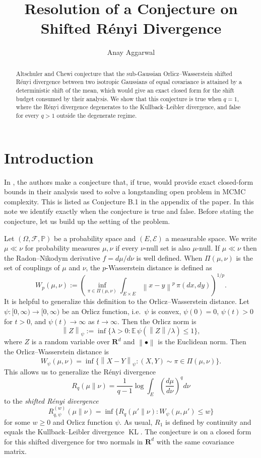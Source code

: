 \documentclass[11pt,reqno]{amsart}
\author{Anay Aggarwal}
\theoremstyle{definition}
\theoremstyle{remark}
\def\R{\mathbf{R}}
\newcommand\opr[1]{\operatorname{#1}}
\newcommand{\pp}{\mathbb{P}}
\newcommand{\ee}{\mathbb{E}}
\def\KL{\opr{KL}}
\newcommand{\norm}[1]{\left\lVert#1\right\rVert}
\numberwithin{equation}{section}
\begin{document}
\title[Shifted R\'enyi Divergence]{Resolution of a Conjecture on Shifted R\'enyi Divergence}

\begin{abstract}
Altschuler and Chewi \cite{altschuler2023fasterhighaccuracylogconcavesampling} conjecture that the sub-Gaussian Orlicz--Wasserstein shifted R\'enyi divergence between two isotropic Gaussians of equal covariance is attained by a deterministic shift of the mean, which would give an exact closed form for the shift budget consumed by their analysis. We show that this conjecture is true when $q=1$, where the R\'enyi divergence degenerates to the Kullback--Leibler divergence, and false for every $q>1$ outside the degenerate regime.
\end{abstract}

\maketitle

\section{Introduction}

In \cite{altschuler2023fasterhighaccuracylogconcavesampling}, the authors make a conjecture that, if true, would provide exact closed-form bounds in their analysis used to solve a longstanding open problem in MCMC complexity. This is listed as Conjecture B.1 in the appendix of the paper. In this note we identify exactly when the conjecture is true and false. Before stating the conjecture, let us build up the setting of the problem.

Let $(\Omega,\mathcal{F},\pp)$ be a probability space and $(E,\mathcal{E})$ a measurable space. We write $\mu\ll \nu$ for probability measures $\mu,\nu$ if every $\nu$-null set is also $\mu$-null. If $\mu\ll \nu$ then the Radon--Nikodym derivative $f=d\mu/d\nu$ is well defined. When $\Pi(\mu,\nu)$ is the set of couplings of $\mu$ and $\nu$, the $p$-Wasserstein distance is defined as
$$W_p(\mu,\nu):=\left(\inf_{\pi\in \Pi(\mu,\nu)}\int_{E\times E}\norm{x-y}^p\,\pi(dx,dy)\right)^{1/p}.$$
It is helpful to generalize this definition to the Orlicz--Wasserstein distance. Let $\psi:[0,\infty)\to[0,\infty)$ be an Orlicz function, i.e.\ $\psi$ is convex, $\psi(0)=0$, $\psi(t)>0$ for $t>0$, and $\psi(t)\to\infty$ as $t\to\infty$. Then the Orlicz norm is
$$\norm{Z}_{\psi}:=\inf\{\lambda>0:\ee\,\psi(\norm{Z}/\lambda)\le 1\},$$
where $Z$ is a random variable over $\R^d$ and $\norm{\bullet}$ is the Euclidean norm. Then the Orlicz--Wasserstein distance is
$$W_{\psi}(\mu,\nu)=\inf\{\norm{X-Y}_{\psi}:(X,Y)\sim \pi\in \Pi(\mu,\nu)\}.$$
This allows us to generalize the R\'enyi divergence
$$R_q(\mu\|\nu)=\frac{1}{q-1}\log \int_E \left(\frac{d\mu}{d\nu}\right)^q d\nu$$
to the \emph{shifted R\'enyi divergence}
$$R^{(w)}_{q,\psi}(\mu\|\nu)=\inf\{R_q(\mu'\|\nu):W_{\psi}(\mu,\mu')\le w\}$$
for some $w\ge 0$ and Orlicz function $\psi$. As usual, $R_1$ is defined by continuity and equals the Kullback--Leibler divergence $\KL$. The conjecture is on a closed form for this shifted divergence for two normals in $\R^d$ with the same covariance matrix.
\end{document}
